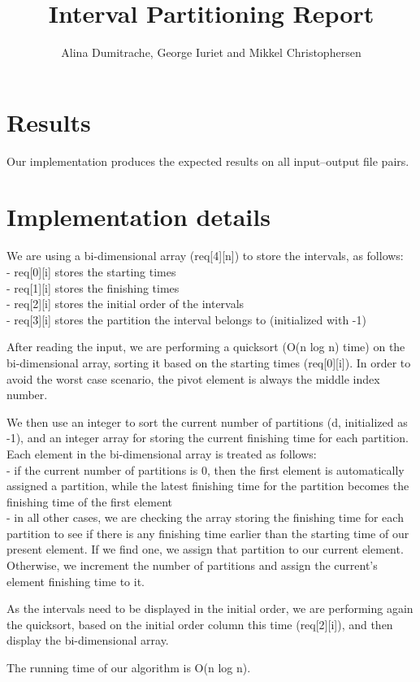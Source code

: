 \documentclass{article}
\title{Interval Partitioning Report}
\author{Alina Dumitrache, George Iuriet and Mikkel Christophersen}
\begin{document}
  \maketitle

  \section{Results}

  Our implementation produces the expected results on all
  input--output file pairs.

  \section{Implementation details}
  We are using a bi-dimensional array (req[4][n]) to store the intervals, as follows:\\
  - req[0][i] stores the starting times \\
  - req[1][i] stores the finishing times \\
  - req[2][i] stores the initial order of the intervals \\
  - req[3][i] stores the partition the interval belongs to (initialized with -1) 

  After reading the input, we are performing a quicksort (O(n log n) time) on the bi-dimensional array, sorting it based on the starting times (req[0][i]). In order to avoid the worst case scenario, the pivot element is always the middle index number.

  We then use an integer to sort the current number of partitions (d, initialized as -1), and an integer array for storing the current finishing time for each partition. Each element in the bi-dimensional array is treated as follows: \\
  - if the current number of partitions is 0, then the first element is automatically assigned a partition, while the latest finishing time for the partition becomes the finishing time of the first element \\
  - in all other cases, we are checking the array storing the finishing time for each partition to see if there is any finishing time earlier than the starting time of our present element. If we find one, we assign that partition to our current element. Otherwise, we increment the number of partitions and assign the current's element finishing time to it.

  As the intervals need to be displayed in the initial order, we are performing again the quicksort, based on the initial order column this time (req[2][i]), and then display the bi-dimensional array.

  The running time of our algorithm is O(n log n).
\end{document}
